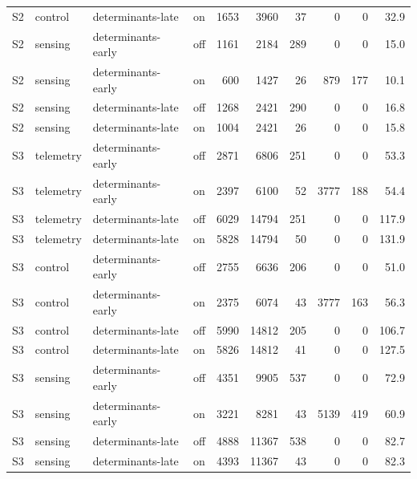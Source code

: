 \documentclass[pdflatex,sn-nature]{sn-jnl}
\theoremstyle{thmstyleone}
\theoremstyle{thmstyletwo}
\theoremstyle{thmstylethree}
\begin{document}
\begin{table}[!htbp]
{\begin{tabular}{llllrrrrrr}
S2 & control & determinants-late & on & 1653 & 3960 & 37 & 0 & 0 & 32.9 \\
S2 & sensing & determinants-early & off & 1161 & 2184 & 289 & 0 & 0 & 15.0 \\
S2 & sensing & determinants-early & on & 600 & 1427 & 26 & 879 & 177 & 10.1 \\
S2 & sensing & determinants-late & off & 1268 & 2421 & 290 & 0 & 0 & 16.8 \\
S2 & sensing & determinants-late & on & 1004 & 2421 & 26 & 0 & 0 & 15.8 \\
S3 & telemetry & determinants-early & off & 2871 & 6806 & 251 & 0 & 0 & 53.3 \\
S3 & telemetry & determinants-early & on & 2397 & 6100 & 52 & 3777 & 188 & 54.4 \\
S3 & telemetry & determinants-late & off & 6029 & 14794 & 251 & 0 & 0 & 117.9 \\
S3 & telemetry & determinants-late & on & 5828 & 14794 & 50 & 0 & 0 & 131.9 \\
S3 & control & determinants-early & off & 2755 & 6636 & 206 & 0 & 0 & 51.0 \\
S3 & control & determinants-early & on & 2375 & 6074 & 43 & 3777 & 163 & 56.3 \\
S3 & control & determinants-late & off & 5990 & 14812 & 205 & 0 & 0 & 106.7 \\
S3 & control & determinants-late & on & 5826 & 14812 & 41 & 0 & 0 & 127.5 \\
S3 & sensing & determinants-early & off & 4351 & 9905 & 537 & 0 & 0 & 72.9 \\
S3 & sensing & determinants-early & on & 3221 & 8281 & 43 & 5139 & 419 & 60.9 \\
S3 & sensing & determinants-late & off & 4888 & 11367 & 538 & 0 & 0 & 82.7 \\
S3 & sensing & determinants-late & on & 4393 & 11367 & 43 & 0 & 0 & 82.3 \\
\bottomrule
\end{tabular}}
\end{table}
\end{document}
